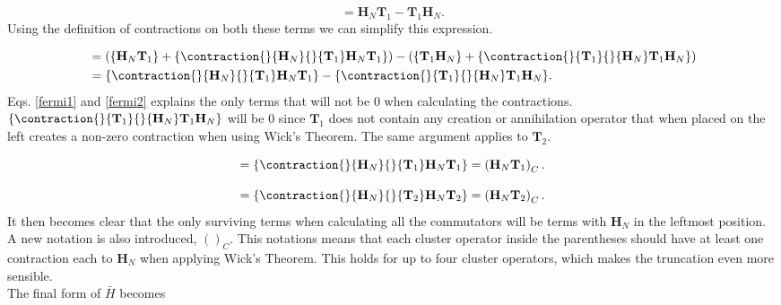 \begin{equation}
[\textbf{H}_N, \textbf{T}_1] = \textbf{H}_N \textbf{T}_1 - \textbf{T}_1 \textbf{H}_N .
\end{equation}
Using the definition of contractions on both these terms we can simplify this expression.

\begin{align}
[\textbf{H}_N, \textbf{T}_1] & =
\left( \{\textbf{H}_N\textbf{T}_1\} + \{
\contraction{}{\textbf{H}_N}{}{\textbf{T}_1}
\textbf{H}_N\textbf{T}_1\} \right) - \left(\{\textbf{T}_1\textbf{H}_N\} + \{
\contraction{}{\textbf{T}_1}{}{\textbf{H}_N}
\textbf{T}_1\textbf{H}_N\} \right) \nonumber \\ &
= \{
\contraction{}{\textbf{H}_N}{}{\textbf{T}_1}
\textbf{H}_N\textbf{T}_1\}
- \{
\contraction{}{\textbf{T}_1}{}{\textbf{H}_N}
\textbf{T}_1\textbf{H}_N\} .
\end{align}
Eqs. \eqref{fermi1} and \eqref{fermi2} explains the only terms that will not be 0 when calculating the contractions. $\{ \contraction{}{\textbf{T}_1}{}{\textbf{H}_N}
\textbf{T}_1\textbf{H}_N\}$ will be 0 since $\textbf{T}_1$ does not contain any creation or annihilation operator that when placed on the left creates a non-zero contraction when using Wick's Theorem. The same argument applies to $\textbf{T}_2$. 

\begin{equation}
[\textbf{H}_N, \textbf{T}_1] = 
\{
\contraction{}{\textbf{H}_N}{}{\textbf{T}_1}
\textbf{H}_N\textbf{T}_1\} 
= \left( \textbf{H}_N \textbf{T}_1 \right)_C
.
\end{equation}

\begin{equation}
[\textbf{H}_N, \textbf{T}_2] = 
\{
\contraction{}{\textbf{H}_N}{}{\textbf{T}_2}
\textbf{H}_N\textbf{T}_2\} 
= \left( \textbf{H}_N \textbf{T}_2 \right)_C
.
\end{equation}
It then becomes clear that the only surviving terms when calculating all the commutators will be terms with $\textbf{H}_N$ in the leftmost position. \\

A new notation is also introduced, $()_C$. This notations means that each cluster operator inside the parentheses should have at least one contraction each to $\textbf{H}_N$ when applying Wick's Theorem. This holds for up to four cluster operators, which makes the truncation even more sensible. \\

The final form of $\bar{H}$ becomes

